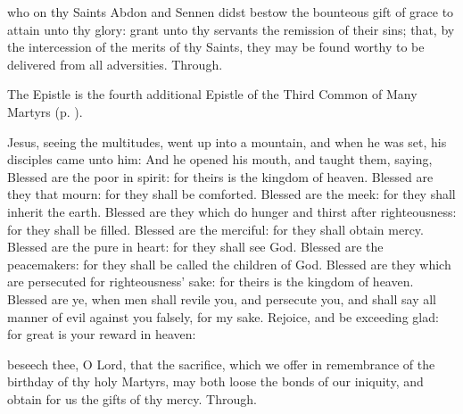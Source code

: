 \collect
{} who on thy Saints Abdon and Sennen didst bestow the bounteous gift of grace to attain unto thy glory: grant unto thy servants the remission of their sins; that, by the intercession of the merits of thy Saints, they may be found worthy to be delivered from all adversities. Through.

\begin{rubric}
	The Epistle is the fourth additional Epistle of the Third Common of Many Martyrs (p. \pageref{2Corinthians64}).
\end{rubric}


 Jesus, seeing the multitudes, went up into a mountain, and when he was set, his disciples came unto him: And he opened his mouth, and taught them, saying, Blessed are the poor in spirit: for theirs is the kingdom of heaven. Blessed are they that mourn: for they shall be comforted. Blessed are the meek: for they shall inherit the earth. Blessed are they which do hunger and thirst after righteousness: for they shall be filled. Blessed are the merciful: for they shall obtain mercy. Blessed are the pure in heart: for they shall see God. Blessed are the peacemakers: for they shall be called the children of God. Blessed are they which are persecuted for righteousness' sake: for theirs is the kingdom of heaven. Blessed are ye, when men shall revile you, and persecute you, and shall say all manner of evil against you falsely, for my sake. Rejoice, and be exceeding glad: for great is your reward in heaven: 


\secret
{} beseech thee, O Lord, that the sacrifice, which we offer in remembrance of the birthday of thy holy Martyrs, may both loose the bonds of our iniquity, and obtain for us the gifts of thy mercy. Through.


